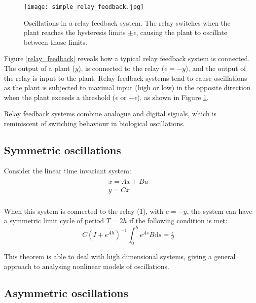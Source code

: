 \documentclass[a4paper, 12pt]{article}
\begin{document}
\begin{figure}[h!]
\texttt{[image: simple\_relay\_feedback.jpg]}
\caption{Oscillations in a relay feedback system. The relay switches when the plant reaches the hysteresis limits $\pm \epsilon$, causing the plant to oscillate between those limits.}
\label{relay_feedback_oscillations}
\end{figure}
\color{black}


Figure \ref{relay_feedback} reveals how a typical relay feedback system is connected. The output of a plant ($y$), is connected to the relay ($e = -y$), and the output of the relay is input to the plant. Relay feedback systems tend to cause oscillations as the plant is subjected to maximal input (high or low) in the opposite direction when the plant exceeds a threshold ($\epsilon$ or $-\epsilon$), as shown in  Figure \ref{relay_feedback_oscillations}.

Relay feedback systems combine analogue and digital signals, which is reminiscent of switching behaviour in biological oscillations.

\subsection{Symmetric oscillations}
Consider the linear time invariant system:
\begin{eqnarray}
\begin{array}{l}
\displaystyle \dot{x} = Ax + Bu \\
\displaystyle y = Cx \\
\end{array}
\label{LTIsystem}
\end{eqnarray}

When this system is connected to the relay (1), with $e = -y$, the system can have a symmetric limit cycle of period $T=2h$ if the following condition is met:
\begin{equation} \label{eq:2_3}
C(I+e^{Ah})^{-1}\int_0^he^{As}B\text{d}s = \tfrac{\epsilon}{d}
\end{equation}

This theorem is able to deal with high dimensional systems, giving a general approach to analysing nonlinear models of oscillations. 

\subsection{Asymmetric oscillations}\label{sec:asymm_oscillations}
\end{document}
